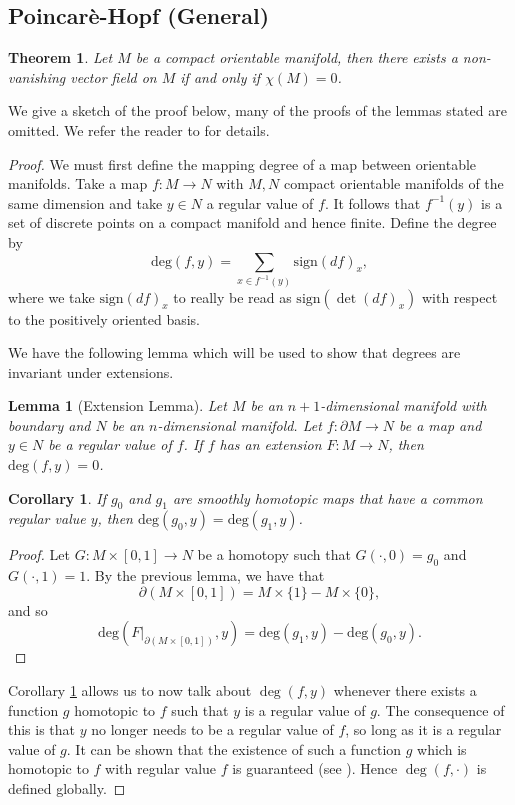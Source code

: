 \documentclass[12pt,a4paper]{article}
\numberwithin{equation}{section}
\newtheorem{lemma}{Lemma}[section]
\newtheorem{theorem}{Theorem}[section]
\newtheorem{corollary}{Corollary}[section]
\theoremstyle{definition}
\theoremstyle{remark}
\begin{document}
\subsection{Poincar\`{e}-Hopf (General) \label{sec:ph-gen-sec}}
\begin{theorem}
Let $M$ be a compact orientable manifold, then there exists a non-vanishing vector field on $M$ if and only if $\chi(M)=0$.
\end{theorem}
We give a sketch of the proof below, many of the proofs of the lemmas stated are omitted. We refer the reader to \cite{wrightPoincare} for details.
\begin{proof}
We must first define the mapping degree of a map between orientable manifolds. Take a map $f:M\to N$ with $M,N$ compact orientable manifolds of the same dimension and take $y\in N$ a regular value of $f$. It follows that $f^{-1}(y)$ is a set of discrete points on a compact manifold and hence finite. Define the degree by
\[
\mathrm{deg}(f,y)=\sum_{x\in f^{-1}(y)}\mathrm{sign}(df)_x,
\]
where we take $\mathrm{sign}(df)_x$ to really be read as $\mathrm{sign}(\det(df)_x)$ with respect to the positively oriented basis.

We have the following lemma which will be used to show that degrees are invariant under extensions.
\begin{lemma}[Extension Lemma]
Let $M$ be an $n+1$-dimensional manifold with boundary and $N$ be an $n$-dimensional manifold. Let $f:\partial M\to N$ be a map and $y\in N$ be a regular value of $f$. If $f$ has an extension $F:M\to N$, then $\mathrm{deg}(f,y)=0$.
\end{lemma}
\begin{corollary}
If $g_0$ and $g_1$ are smoothly homotopic maps that have a common regular value $y$, then $\mathrm{deg}(g_0,y)=\mathrm{deg}(g_1,y)$.
\label{cor:homt-deg}
\end{corollary}
\begin{proof}
Let $G:M\times [0,1]\to N$ be a homotopy such that $G(\cdot,0)=g_0$ and $G(\cdot,1)=1$. By the previous lemma, we have that
\[
\partial(M\times [0,1])=M\times\{1\}- M\times\{0\},
\]
and so
\[
\mathrm{deg}(F\rvert_{\partial(M\times [0,1])},y)=\mathrm{deg}(g_1,y)-\mathrm{deg}(g_0,y).
\]
\end{proof}
Corollary \ref{cor:homt-deg} allows us to now talk about $\deg(f,y)$ whenever there exists a function $g$ homotopic to $f$ such that $y$ is a regular value of $g$. The consequence of this is that $y$ no longer needs to be a regular value of $f$, so long as it is a regular value of $g$. It can be shown that the existence of such a function $g$ which is homotopic to $f$ with regular value $f$ is guaranteed (see \cite{BurnsGidea,wrightPoincare}). Hence $\deg(f,\cdot)$ is defined globally.


\end{proof}
\end{document}
